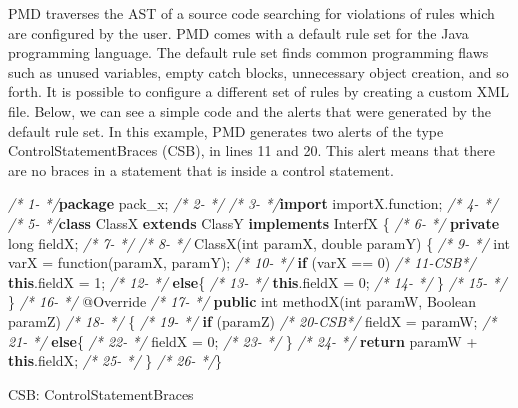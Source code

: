 \documentclass[
]{article}
\newenvironment{Shaded}{\begin{snugshade}}{\end{snugshade}}
\newcommand{\AttributeTok}[1]{\textcolor[rgb]{0.77,0.63,0.00}{#1}}
\newcommand{\BuiltInTok}[1]{#1}
\newcommand{\CommentTok}[1]{\textcolor[rgb]{0.56,0.35,0.01}{\textit{#1}}}
\newcommand{\DataTypeTok}[1]{\textcolor[rgb]{0.13,0.29,0.53}{#1}}
\newcommand{\DecValTok}[1]{\textcolor[rgb]{0.00,0.00,0.81}{#1}}
\newcommand{\FunctionTok}[1]{\textcolor[rgb]{0.00,0.00,0.00}{#1}}
\newcommand{\ImportTok}[1]{#1}
\newcommand{\KeywordTok}[1]{\textcolor[rgb]{0.13,0.29,0.53}{\textbf{#1}}}
\newcommand{\NormalTok}[1]{#1}
\begin{document}
PMD traverses the AST of a source code searching for violations of rules
which are configured by the user. PMD comes with a default rule set for
the Java programming language. The default rule set finds common
programming flaws such as unused variables, empty catch blocks,
unnecessary object creation, and so forth. It is possible to configure a
different set of rules by creating a custom XML file. Below, we can see
a simple code and the alerts that were generated by the default rule
set. In this example, PMD generates two alerts of the type
ControlStatementBraces (CSB), in lines 11 and 20. This alert means that
there are no braces in a statement that is inside a control statement.

\small

\normalsize

\newpage

\small

\begin{Shaded}
\begin{Highlighting}[]
\CommentTok{/*  1-   */}\KeywordTok{package}\ImportTok{ pack_x;}
\CommentTok{/*  2-   */}  
\CommentTok{/*  3-   */}\KeywordTok{import}\ImportTok{ importX.function;}
\CommentTok{/*  4-   */}
\CommentTok{/*  5-   */}\KeywordTok{class}\NormalTok{ ClassX }\KeywordTok{extends}\NormalTok{ ClassY }\KeywordTok{implements}\NormalTok{ InterfX \{}
\CommentTok{/*  6-   */}    \KeywordTok{private} \DataTypeTok{long}\NormalTok{ fieldX;}
\CommentTok{/*  7-   */}    
\CommentTok{/*  8-   */}    \FunctionTok{ClassX}\NormalTok{(}\DataTypeTok{int}\NormalTok{ paramX, }\DataTypeTok{double}\NormalTok{ paramY) \{}
\CommentTok{/*  9-   */}        \DataTypeTok{int}\NormalTok{ varX = }\FunctionTok{function}\NormalTok{(paramX, paramY);}
\CommentTok{/* 10-   */}        \KeywordTok{if}\NormalTok{ (varX == }\DecValTok{0}\NormalTok{)}
\CommentTok{/* 11-CSB*/}            \KeywordTok{this}\NormalTok{.}\FunctionTok{fieldX}\NormalTok{ = }\DecValTok{1}\NormalTok{;}
\CommentTok{/* 12-   */}        \KeywordTok{else}\NormalTok{\{}
\CommentTok{/* 13-   */}            \KeywordTok{this}\NormalTok{.}\FunctionTok{fieldX}\NormalTok{ = }\DecValTok{0}\NormalTok{;}
\CommentTok{/* 14-   */}\NormalTok{     \}}
\CommentTok{/* 15-   */}\NormalTok{    \}}
\CommentTok{/* 16-   */}    \AttributeTok{@Override}
\CommentTok{/* 17-   */}    \KeywordTok{public} \DataTypeTok{int} \FunctionTok{methodX}\NormalTok{(}\DataTypeTok{int}\NormalTok{ paramW, }\BuiltInTok{Boolean}\NormalTok{ paramZ)}
\CommentTok{/* 18-   */}\NormalTok{    \{}
\CommentTok{/* 19-   */}        \KeywordTok{if}\NormalTok{ (paramZ)}
\CommentTok{/* 20-CSB*/}\NormalTok{            fieldX = paramW;}
\CommentTok{/* 21-   */}        \KeywordTok{else}\NormalTok{\{}
\CommentTok{/* 22-   */}\NormalTok{            fieldX = }\DecValTok{0}\NormalTok{;}
\CommentTok{/* 23-   */}\NormalTok{     \}}
\CommentTok{/* 24-   */}        \KeywordTok{return}\NormalTok{ paramW + }\KeywordTok{this}\NormalTok{.}\FunctionTok{fieldX}\NormalTok{;}
\CommentTok{/* 25-   */}\NormalTok{     \}}
\CommentTok{/* 26-   */}\NormalTok{\}  }


\NormalTok{CSB: ControlStatementBraces}
\end{Highlighting}
\end{Shaded}
\end{document}
